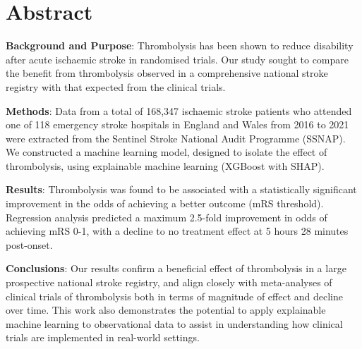 \section*{Abstract}

\textbf{Background and Purpose}: Thrombolysis has been shown to reduce disability after acute ischaemic stroke in randomised trials. Our study sought to compare the benefit from thrombolysis observed in a comprehensive national stroke registry with that expected from the clinical trials.

\textbf{Methods}: Data from a total of 168,347 ischaemic stroke patients who attended one of 118 emergency stroke hospitals in England and Wales from 2016 to 2021 were extracted from the Sentinel Stroke National Audit Programme (SSNAP). We constructed a machine learning model, designed to isolate the effect of thrombolysis, using explainable machine learning (XGBoost with SHAP).

\textbf{Results}: Thrombolysis was found to be associated with a statistically significant improvement in the odds of achieving a better outcome (mRS threshold). Regression analysis predicted a maximum 2.5-fold improvement in odds of achieving mRS 0-1, with a decline to no treatment effect at 5 hours 28 minutes post-onset.

\textbf{Conclusions}:  Our results confirm a beneficial effect of thrombolysis in a large prospective national stroke registry, and align closely with meta-analyses of clinical trials of thrombolysis both in terms of magnitude of effect and decline over time. This work also demonstrates the potential to apply explainable machine learning to observational data to assist in understanding how clinical trials are implemented in real-world settings.
